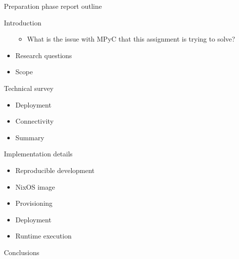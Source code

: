 \begin{frame}{Preparation phase report outline}
\begin{block}{Introduction}
\begin{itemize}
  \begin{itemize}
  \tightlist
  \item
    What is the issue with MPyC that this assignment is trying to solve?
  \end{itemize}
\item
  Research questions
\item
  Scope
\end{itemize}
\end{block}

\begin{block}{Technical survey}
\protect\hypertarget{notes__05000-prep.md__technical-survey}{}
\begin{itemize}
\tightlist
\item
  Deployment
\item
  Connectivity
\item
  Summary
\end{itemize}
\end{block}

\begin{block}{Implementation details}
\protect\hypertarget{notes__05000-prep.md__implementation-details}{}
\begin{itemize}
\tightlist
\item
  Reproducible development
\item
  NixOS image
\item
  Provisioning
\item
  Deployment
\item
  Runtime execution
\end{itemize}
\end{block}

\begin{block}{Conclusions}
\protect\hypertarget{notes__05000-prep.md__conclusions}{}
\end{block}
\end{frame}

